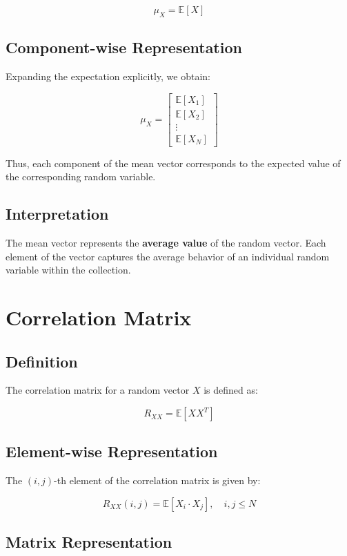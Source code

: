 \documentclass{article}
\begin{document}
\[
\mu_X = \mathbb{E}[X]
\]

\subsection{Component-wise Representation}

Expanding the expectation explicitly, we obtain:

\[
\mu_X =
\begin{bmatrix}
\mathbb{E}[X_1] \\
\mathbb{E}[X_2] \\
\vdots \\
\mathbb{E}[X_N]
\end{bmatrix}
\]

Thus, each component of the mean vector corresponds to the expected value of the corresponding random variable.

\subsection{Interpretation}

The mean vector represents the \textbf{average value} of the random vector. Each element of the vector captures the average behavior of an individual random variable within the collection.

\section{Correlation Matrix}

\subsection{Definition}

The correlation matrix for a random vector $X$ is defined as:

\[
R_{XX} = \mathbb{E}[X X^T]
\]

\subsection{Element-wise Representation}

The $(i,j)$-th element of the correlation matrix is given by:

\[
R_{XX}(i,j) = \mathbb{E}[X_i \cdot X_j], \quad i,j \leq N
\]

\subsection{Matrix Representation}
\end{document}
